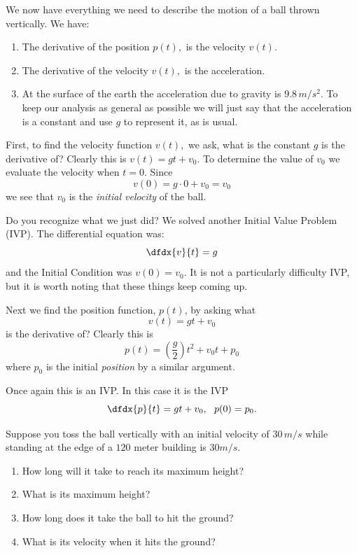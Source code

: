 We now have everything we need to describe the motion of a ball thrown
vertically. We have:
\begin{enumerate}
\item The derivative of the position $p(t),$ is the velocity $v(t).$
\item The derivative of the velocity $v(t),$ is the acceleration.
\item At the surface of the earth the acceleration due to gravity is
  $9.8\,m/s^2.$ To keep our analysis as general as possible we will
  just say that the acceleration is a constant and use $g$ to
  represent it, as is usual.
\end{enumerate}

First, to find the velocity function $v(t),$ we ask, what is the
constant $g$ is the derivative of?  Clearly this is $v(t) =g t+ v_0.$
To determine the value of $v_0$ we evaluate the velocity when $t=0.$
Since
$$
v(0) = g\cdot0+v_0 = v_0
$$
we see that $v_0$ is the \emph{initial velocity} of the ball.

Do you recognize what we just did? We solved another Initial Value
Problem (IVP). The differential equation was:
$$
\dfdx{v}{t}=g
$$
and the Initial Condition was $v(0)= v_0.$ It is not a particularly
difficulty IVP, but it is worth noting that these things keep coming
up.

Next we find the position function, $p(t)$, by asking what 
$$
v(t) = g t+v_0
$$ 
is the derivative of? Clearly this is 
$$
p(t) = 
\left(
  \frac{g}{2}
\right)t^2+v_0t+p_0
$$
where $p_0$ is the initial \emph{position} by a similar argument.

Once again this is an IVP. In this case it is the IVP
$$
\dfdx{p}{t}=gt+v_0,\ \ p(0)=p_0.
$$

\begin{myexample}
  Suppose you toss the ball vertically with an  initial velocity of
  $30\,m/s$ while standing at the edge of a $120$ meter building
  is $30 m/s.$ 
  \begin{enumerate}[label={\bf{}(\alph*)}]
  \item How long will it take to reach its maximum height?
  \item What is its maximum height?
  \item How long does it take the ball to hit the ground?
  \item What is its velocity when it hits the ground?
  \end{enumerate}
\end{myexample}

